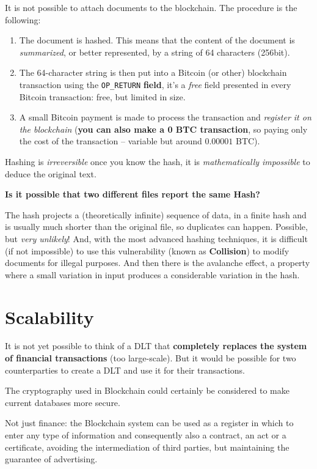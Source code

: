 It is not possible to attach documents to the blockchain. The procedure is the following:
\begin{enumerate}
    \item The document is hashed. This means that the content of the document is \textit{summarized}, or better represented, by a string of 64 characters (256bit).
    \item The 64-character string is then put into a Bitcoin (or other) blockchain transaction using the \texttt{OP\_RETURN} \textbf{field}, it's a \textit{free} field presented in every Bitcoin transaction: free, but limited in size.
    \item A small Bitcoin payment is made to process the transaction and \textit{register it on the blockchain} (\textbf{you can also make a 0 BTC transaction}, so paying only the cost of the transaction -- variable but around $0.00001$ BTC).
\end{enumerate}

Hashing is \textit{irreversible} once you know the hash, it is \textit{mathematically impossible} to deduce the original text.

\textbf{Is it possible that two different files report the same Hash?}

The hash projects a (theoretically infinite) sequence of data, in a finite hash and is usually much shorter than the original file, so duplicates can happen. Possible, but \textit{very unlikely}! And, with the most advanced hashing techniques, it is difficult (if not impossible) to use this vulnerability (known as \textbf{Collision}) to modify documents for illegal purposes. And then there is the avalanche effect, a property where a small variation in input produces a considerable variation in the hash.

\section{Scalability}

It is not yet possible to think of a DLT that \textbf{completely replaces the system of financial transactions} (too large-scale). But it would be possible for two counterparties to create a DLT and use it for their transactions.

The cryptography used in Blockchain could certainly be considered to make current databases more secure.

Not just finance: the Blockchain system can be used as a register in which to enter any type of information and consequently also a contract, an act or a certificate, avoiding the intermediation of third parties, but maintaining the guarantee of advertising.

